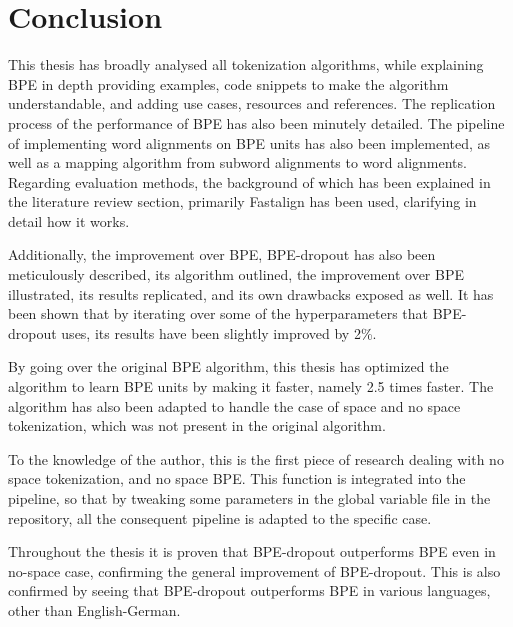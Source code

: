 %
%

\chapter{Conclusion}\label{ch:conclusion}

This thesis has broadly analysed all tokenization algorithms, while explaining BPE in depth providing examples, code snippets to make the algorithm understandable, and adding use cases, resources and references. The replication process of the performance of BPE has also been minutely detailed. The pipeline of implementing word alignments on BPE units has also been implemented, as well as a mapping algorithm from subword alignments to word alignments. Regarding evaluation methods, the background of which has been explained in the literature review section, primarily Fastalign has been used, clarifying in detail how it works.

Additionally, the improvement over BPE, BPE-dropout has also been meticulously described, its algorithm outlined, the improvement over BPE illustrated, its results replicated, and its own drawbacks exposed as well. It has been shown that by iterating over some of the hyperparameters that BPE-dropout uses, its results have been slightly improved by 2\%.

By going over the original BPE algorithm, this thesis has optimized the algorithm to learn BPE units by making it faster, namely 2.5 times faster. The algorithm has also been adapted to handle the case of space and no space tokenization, which was not present in the original algorithm.

To the knowledge of the author, this is the first piece of research dealing with no space tokenization, and no space BPE. This function is integrated into the pipeline, so that by tweaking some parameters in the global variable file in the repository, all the consequent pipeline is adapted to the specific case.

Throughout the thesis it is proven that BPE-dropout outperforms BPE even in no-space case, confirming the general improvement of BPE-dropout. This is also confirmed by seeing that BPE-dropout outperforms BPE in various languages, other than English-German.

